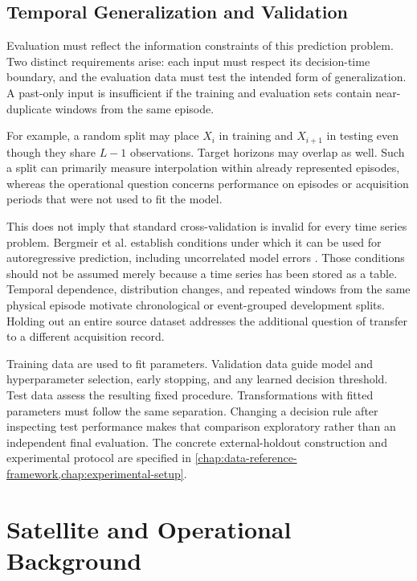 \subsection{Temporal Generalization and Validation}
\label{sec:background-validation}

Evaluation must reflect the information constraints of this prediction problem.
Two distinct requirements arise: each input must respect its decision-time
boundary, and the evaluation data must test the intended form of generalization.
A past-only input is insufficient if the training and evaluation sets contain
near-duplicate windows from the same episode.

For example, a random split may place \(X_i\) in training and \(X_{i+1}\) in
testing even though they share \(L-1\) observations. Target horizons may overlap
as well. Such a split can primarily measure interpolation within already
represented episodes, whereas the operational question concerns performance on
episodes or acquisition periods that were not used to fit the model.

This does not imply that standard cross-validation is invalid for every time
series problem. Bergmeir et al. establish conditions under which it can be used
for autoregressive prediction, including uncorrelated model errors
\cite{bergmeir2018note}. Those conditions should not be assumed merely because a
time series has been stored as a table. Temporal dependence, distribution
changes, and repeated windows from the same physical episode motivate
chronological or event-grouped development splits. Holding out an entire source
dataset addresses the additional question of transfer to a different acquisition
record.

Training data are used to fit parameters. Validation data guide model and
hyperparameter selection, early stopping, and any learned decision threshold.
Test data assess the resulting fixed procedure. Transformations with fitted
parameters must follow the same separation. Changing a decision rule after
inspecting test performance makes that comparison exploratory rather than an
independent final evaluation. The concrete external-holdout construction and
experimental protocol are specified in
\cref{chap:data-reference-framework,chap:experimental-setup}.

\section{Satellite and Operational Background}
\label{sec:background-satellite-operational}

